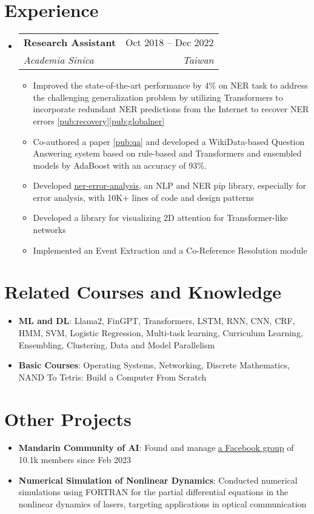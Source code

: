 \documentclass[letterpaper,11pt]{article}
\makeatletter
\newcommand{\resumeItem}[1]{
  \item\small{
    {#1 \vspace{-2pt}}
  }
}
\newcommand{\resumeSubheading}[4]{
  \vspace{-2pt}\item
    \begin{tabular*}{0.97\textwidth}[t]{l@{\extracolsep{\fill}}r}
      \textbf{#1} & #2 \\
      \textit{\small#3} & \textit{\small #4} \\
    \end{tabular*}\vspace{-7pt}
}
\newcommand{\resumeSubHeadingListStart}{\begin{itemize}[leftmargin=0.15in, label={}]}
\newcommand{\resumeSubHeadingListEnd}{\end{itemize}}
\newcommand{\resumeItemListStart}{\begin{itemize}}
\newcommand{\resumeItemListEnd}{\end{itemize}\vspace{-5pt}}
\newcommand{\titledItem}[2]{
  \item\small{
    {\textbf{#1}: #2 \vspace{-9pt}}
  }
}
\newcommand{\simpleListStart}{\begin{itemize}[leftmargin=0.15in, label={}]}
\newcommand{\simpleListEnd}{\end{itemize}\vspace{-5pt}}
\makeatother
\begin{document}
\section{Experience}
  \resumeSubHeadingListStart

    \resumeSubheading
      {Research Assistant}{Oct 2018 -- Dec 2022}
      {Academia Sinica}{Taiwan}
      \resumeItemListStart
        \resumeItem{Improved the state-of-the-art performance by 4\% on NER task to address the challenging generalization problem by utilizing Transformers to incorporate redundant NER predictions from the Internet to recover NER errors \ref{pub:recovery}\ref{pub:globalner}}
        \resumeItem{Co-authored a paper \ref{pub:qa} and developed a WikiData-based Question Answering system based on rule-based and Transformers and ensembled models by AdaBoost with an accuracy of 93\%.}
        \resumeItem{Developed \href{https://pypi.org/project/ner-error-analysis/}{\underline{ner-error-analysis}}, an NLP and NER pip library, especially for error analysis, with 10K+ lines of code and design patterns}
        \resumeItem{Developed a library for visualizing 2D attention for Transformer-like networks}
        \resumeItem{Implemented an Event Extraction and a Co-Reference Resolution module}
      \resumeItemListEnd
  \resumeSubHeadingListEnd

\section{Related Courses and Knowledge}
 \simpleListStart
    \titledItem{ML and DL}{Llama2, FinGPT, Transformers, LSTM, RNN, CNN, CRF, HMM, SVM, Logistic Regression, Multi-task learning, Curriculum Learning, Ensembling, Clustering, Data and Model Parallelism}
    \titledItem{Basic Courses}{Operating Systems, Networking, Discrete Mathematics, NAND To Tetris: Build a Computer From Scratch}
 \simpleListEnd

 \section{Other Projects}
    \simpleListStart
        \titledItem{Mandarin Community of AI}{Found and manage \href{https://www.facebook.com/groups/demoai}{\underline{a Facebook group}} of 10.1k members since Feb 2023}
        \titledItem{Numerical Simulation of Nonlinear Dynamics}{Conducted numerical simulations using FORTRAN for the partial differential equations in the nonlinear dynamics of lasers, targeting applications in optical communication}
    \simpleListEnd
\end{document}
